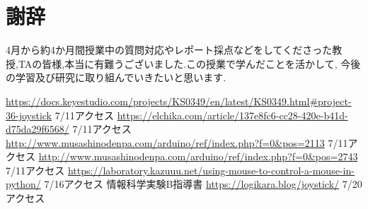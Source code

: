 \documentclass[dvipdfmx]{jarticle}
\begin{document}
\section{謝辞}
4月から約4か月間授業中の質問対応やレポート採点などをしてくださった教授,TAの皆様,本当に有難うございました.この授業で学んだことを活かして,
今後の学習及び研究に取り組んでいきたいと思います.
\begin{thebibliography}{99}
     \url{https://docs.keyestudio.com/projects/KS0349/en/latest/KS0349.html#project-36-joystick} 7/11アクセス
     \url{https://elchika.com/article/137e8fc6-cc28-420e-b41d-d75da29f6568/} 7/11アクセス
     \url{http://www.musashinodenpa.com/arduino/ref/index.php?f=0&pos=2113} 7/11アクセス
     \url{http://www.musashinodenpa.com/arduino/ref/index.php?f=0&pos=2743} 7/11アクセス
     \url{https://laboratory.kazuuu.net/using-mouse-to-control-a-mouse-in-python/} 7/16アクセス
     情報科学実験B指導書
     \url{https://logikara.blog/joystick/} 7/20アクセス
\end{thebibliography}
\end{document}
